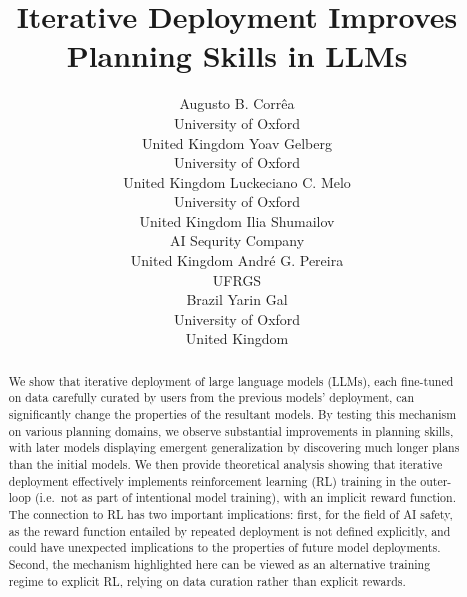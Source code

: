\documentclass{article}
\title{Iterative Deployment Improves\\Planning Skills in LLMs}
\author{Augusto B. Corr\^{e}a\\
University of Oxford\\
United Kingdom
 \And
Yoav Gelberg\\
University of Oxford\\
United Kingdom
\And
Luckeciano C. Melo\\
University of Oxford\\
United Kingdom
\AND
Ilia Shumailov\\
AI Sequrity Company\\
United Kingdom
\And
Andr\'{e} G. Pereira\\
UFRGS\\
Brazil
 \And
Yarin Gal\\
University of Oxford\\
United Kingdom}
\begin{document}
\maketitle

\begin{abstract}

We show that iterative deployment of large language models (LLMs), each fine-tuned on data carefully curated by users from the previous models' deployment, can significantly change the properties of the resultant models.
By testing this mechanism on various planning domains, we observe substantial improvements in planning skills, with later models displaying emergent generalization by discovering much longer plans than the initial models.
We then provide theoretical analysis showing that iterative deployment effectively implements reinforcement learning (RL) training in the outer-loop (i.e.\ not as part of intentional model training), with an implicit reward function.
The connection to RL has two important implications: first, for the field of AI safety, as the reward function entailed by repeated deployment is not defined explicitly, and could have unexpected implications to the properties of future model deployments. Second, the mechanism highlighted here can
be viewed as an alternative training regime to explicit RL, relying on data curation rather than explicit rewards.
\end{abstract}












\newpage
\appendix

\end{document}
